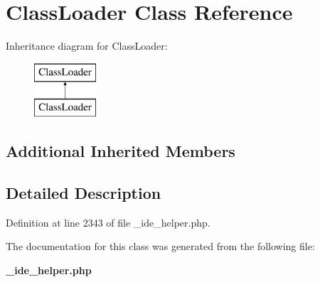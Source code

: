 \section{Class\+Loader Class Reference}
\label{class_class_loader}
Inheritance diagram for Class\+Loader\+:\begin{figure}[H]
\begin{center}
\leavevmode
\includegraphics[height=2.000000cm]{class_class_loader}
\end{center}
\end{figure}
\subsection*{Additional Inherited Members}


\subsection{Detailed Description}


Definition at line 2343 of file \+\_\+ide\+\_\+helper.\+php.



The documentation for this class was generated from the following file\+:\begin{DoxyCompactItemize}
\item 
{\bf \+\_\+ide\+\_\+helper.\+php}\end{DoxyCompactItemize}
